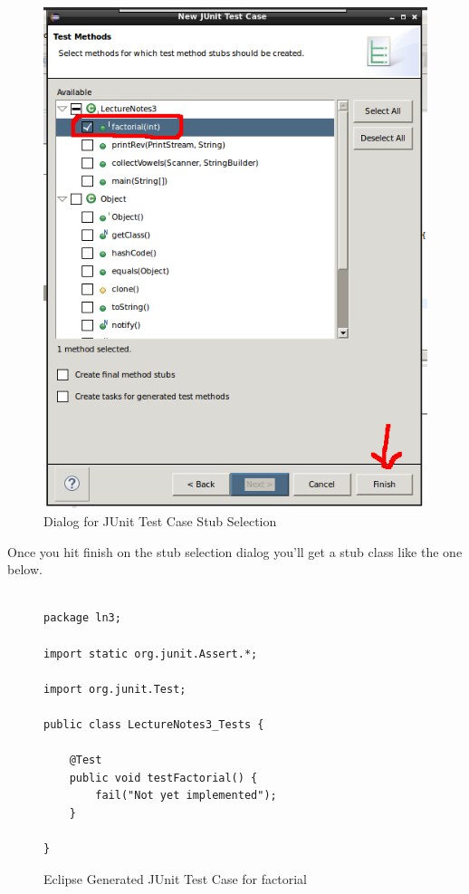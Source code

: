 \documentclass[]{tufte-handout}
\begin{document}
\vspace{.1in}
\begin{center}
\begin{figure}[!htb]
\includegraphics[scale=.5]{Eclipse-JUnitCaseStubSelect.png}
\caption{Dialog for JUnit Test Case Stub Selection}
\label{fig:selectstubs}
\end{figure}
\end{center}
\vspace{.1in}

Once you hit finish on the stub selection dialog you'll get a stub class like the one below.
\begin{figure}
\begin{lstlisting}

package ln3;

import static org.junit.Assert.*;

import org.junit.Test;

public class LectureNotes3_Tests {

	@Test
	public void testFactorial() {
		fail("Not yet implemented");
	}

}

\end{lstlisting}
\caption{Eclipse Generated JUnit Test Case for factorial}
\label{fig:testStub}
\end{figure}
\end{document}
